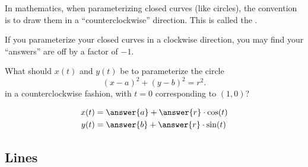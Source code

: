 \documentclass{ximera}
\begin{document}
\begin{question}
\begin{question}
\begin{question}
\begin{prompt}
\begin{multipleChoice}
        \end{multipleChoice}
      \end{prompt}
  \end{question}
\end{question}
\end{question}

In mathematics, when parameterizing closed curves (like circles), the
convention is to draw them in a ``counterclockwise'' direction. This
is called the .

\begin{warning}
  If you parameterize your closed curves in a clockwise direction, you
  may find your ``answers'' are off by a factor of $-1$.
\end{warning}

\begin{question}
What should $x(t)$ and $y(t)$ be to parameterize the circle
\[
(x-a)^2 + (y-b)^2 = r^2.
\]
in a counterclockwise fashion, with $t=0$ corresponding to $(1,0)$?
\begin{prompt}
  \begin{align*}
    x(t) &= \answer{a} + \answer{r}\cdot \cos(t)\\
    y(t) &= \answer{b} + \answer{r}\cdot \sin(t)
  \end{align*}
\end{prompt}
\end{question}



\subsection{Lines}
\end{document}
